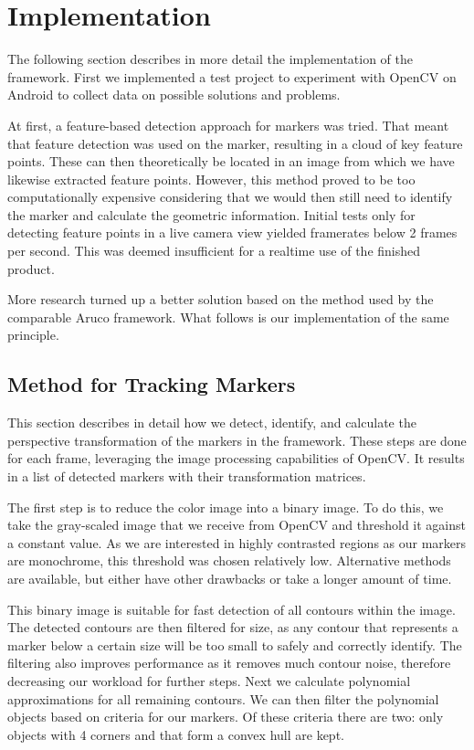 \section{Implementation}

The following section describes in more detail the implementation of the framework.
First we implemented a test project to experiment with OpenCV on Android to collect data on possible solutions and problems.

At first, a feature-based detection approach for markers was tried.
That meant that feature detection was used on the marker, resulting in a cloud of key feature points.
These can then theoretically be located in an image from which we have likewise extracted feature points.
However, this method proved to be too computationally expensive considering that we would then still need to identify the marker and calculate the geometric information.
Initial tests only for detecting feature points in a live camera view yielded framerates below 2 frames per second.
This was deemed insufficient for a realtime use of the finished product.

More research turned up a better solution based on the method used by the comparable Aruco\cite{aruco} framework.
What follows is our implementation of the same principle.

\subsection{Method for Tracking Markers}
\label{detection_workflow}

This section describes in detail how we detect, identify, and calculate the perspective transformation of the markers in the framework.
These steps are done for each frame, leveraging the image processing capabilities of OpenCV.
It results in a list of detected markers with their transformation matrices.

The first step is to reduce the color image into a binary image.
To do this, we take the gray-scaled image that we receive from OpenCV and threshold it against a constant value.
As we are interested in highly contrasted regions as our markers are monochrome, this threshold was chosen relatively low.
Alternative methods are available, but either have other drawbacks or take a longer amount of time.

This binary image is suitable for fast detection of all contours within the image.
The detected contours are then filtered for size, as any contour that represents a marker below a certain size will be too small to safely and correctly identify.
The filtering also improves performance as it removes much contour noise, therefore decreasing our workload for further steps.
Next we calculate polynomial approximations for all remaining contours.
We can then filter the polynomial objects based on criteria for our markers.
Of these criteria there are two: only objects with 4 corners and that form a convex hull are kept.


